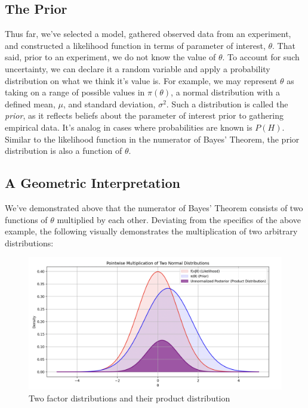 \documentclass[12pt]{article}
\begin{document}
\subsection*{The Prior}
\noindent Thus far, we've selected a model, gathered observed data from an experiment, and constructed a likelihood function in terms of parameter of interest, $\theta$. That said, prior to an experiment, we do not know the value of $\theta$. To account for such uncertainty, we can declare it a random variable and apply a probability distribution on what we think it's value is. For example, we may represent $\theta$ as taking on a range of possible values in $\pi(\theta)$, a normal distribution with a defined mean, $\mu$, and standard deviation, $\sigma^2$. Such a distribution is called the \textit{prior}, as it reflects beliefs about the parameter of interest prior to gathering empirical data. It's analog in cases where probabilities are known is $P(H)$. Similar to the likelihood function in the numerator of Bayes' Theorem, the prior distribution is also a function of $\theta$.

\subsection*{A Geometric Interpretation}
\noindent We've demonstrated above that the numerator of Bayes' Theorem consists of two functions of $\theta$ multiplied by each other. Deviating from the specifics of the above example, the following visually demonstrates the multiplication of two arbitrary distributions:

\begin{figure}[h!]
\centering
\includegraphics[width=1.0\textwidth]{assets/visual_8.png} 
\caption{Two factor distributions and their product distribution}
\label{fig:cond_prob}
\end{figure}
\end{document}
